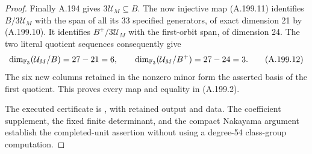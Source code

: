 \begin{proof}
Finally A.194 gives \(3\mathcal U_M\subseteq B\).
The now injective map (A.199.11) identifies
\(B/3\mathcal U_M\) with the span of all its 33
specified generators, of exact dimension 21 by
(A.199.10).  It identifies \(B^+/3\mathcal U_M\)
with the first-orbit span, of dimension 24.  The two
literal quotient sequences consequently give
\[
 \dim_{\mathbb F_3}(\mathcal U_M/B)=27-21=6,
 \qquad
 \dim_{\mathbb F_3}(\mathcal U_M/B^+)=27-24=3.
\tag{A.199.12}
\]
The six new columns retained in the nonzero minor form
the asserted basis of the first quotient.  This proves
every map and equality in (A.199.2).

The executed certificate is
,
with retained output and data.  The coefficient supplement,
the fixed finite determinant, and the compact Nakayama
argument establish the completed-unit assertion without
using a degree-54 class-group computation.
\end{proof}

